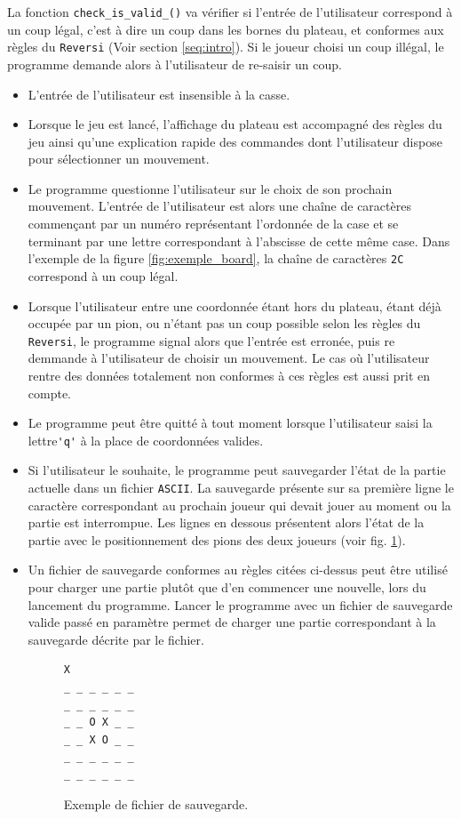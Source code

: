 \documentclass[10pt,a4paper]{article}
\begin{document}
La fonction \verb!check_is_valid_()! va vérifier si l'entrée de l'utilisateur correspond à un coup légal, c'est à dire un coup dans les bornes du plateau, et conformes aux règles du \verb!Reversi! (Voir section \ref{seq:intro}). Si le joueur choisi un coup illégal, le programme demande alors à l'utilisateur de re-saisir un coup.\\

\begin{itemize}
\item L'entrée de l'utilisateur est insensible à la casse.
\item Lorsque le jeu est lancé, l'affichage du plateau est accompagné des règles du jeu ainsi qu'une explication rapide des commandes dont l'utilisateur dispose pour sélectionner un mouvement.
\item Le programme questionne l'utilisateur sur le choix de son prochain mouvement. L'entrée de l'utilisateur est alors une chaîne de caractères commençant par un numéro représentant l'ordonnée de la case et se terminant par une lettre correspondant à l'abscisse de cette même case. Dans l'exemple de la figure \ref{fig:exemple_board}, la chaîne de caractères \verb!2C! correspond à un coup légal.
\item Lorsque l'utilisateur entre une coordonnée étant hors du plateau, étant déjà occupée par un pion, ou n'étant pas un coup possible selon les règles du \verb!Reversi!, le programme signal alors que l'entrée est erronée, puis re demmande à l'utilisateur de choisir un mouvement. Le cas où l'utilisateur rentre des données totalement non conformes à ces règles est aussi prit en compte.
\item Le programme peut être quitté à tout moment lorsque l'utilisateur saisi la lettre\verb!'q'! à la place de coordonnées valides.
\item Si l'utilisateur le souhaite, le programme peut sauvegarder l'état de la partie actuelle dans un fichier \verb!ASCII!. La sauvegarde présente sur sa première ligne le caractère correspondant au prochain joueur qui devait jouer au moment ou la partie est interrompue. Les lignes en dessous présentent alors l'état de la partie avec le positionnement des pions des deux joueurs (voir fig. \ref{fig:exemple_save}).
\item Un fichier de sauvegarde conformes au règles citées ci-dessus peut être utilisé pour charger une partie plutôt que d'en commencer une nouvelle, lors du lancement du programme.  Lancer le programme avec un fichier de sauvegarde valide passé en paramètre permet de charger une partie correspondant à la sauvegarde décrite par le fichier.
\begin{figure}[H]    
\centering
\begin{BVerbatim}
X
_ _ _ _ _ _
_ _ _ _ _ _
_ _ O X _ _
_ _ X O _ _
_ _ _ _ _ _
_ _ _ _ _ _ 
\end{BVerbatim}
\caption {Exemple de fichier de sauvegarde.\label{fig:exemple_save}}
\end{figure}


\end{itemize}
\end{document}
